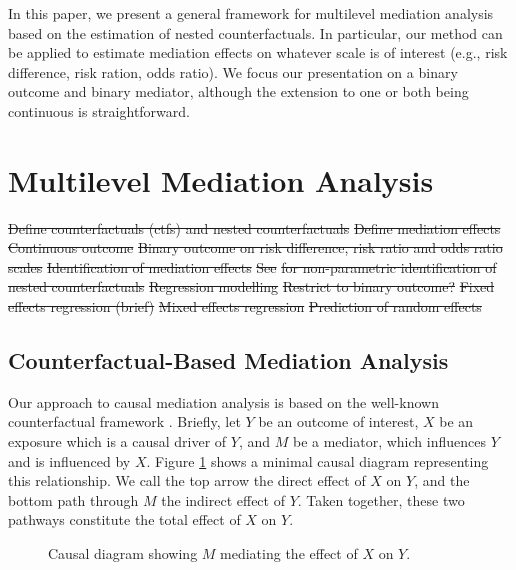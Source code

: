 \documentclass{article}
\begin{document}
In this paper, we present a general framework for multilevel mediation analysis based on the estimation of nested counterfactuals. In particular, our method can be applied to estimate mediation effects on whatever scale is of interest (e.g., risk difference, risk ration, odds ratio). We focus our presentation on a binary outcome and binary mediator, although the extension to one or both being continuous is straightforward.




\section{Multilevel Mediation Analysis}

\begin{outline}
    \1 \st{Define counterfactuals (ctfs) and nested counterfactuals }
    \1 \st{Define mediation effects}
        \2 \st{Continuous outcome}
        \2 \st{Binary outcome on risk difference, risk ratio and odds ratio scales}
    \1 \st{Identification of mediation effects}
        \2 \st{See} \citet{Ima10I} \st{for non-parametric identification of nested counterfactuals}
    \1 \st{Regression modelling}
        \2 \st{Restrict to binary outcome?}
        \2 \st{Fixed effects regression (brief)}
        \2 \st{Mixed effects regression}
        \2 \st{Prediction of random effects}
\end{outline}


\subsection{Counterfactual-Based Mediation Analysis}
\label{sec:MA_defns}

Our approach to causal mediation analysis is based on the well-known counterfactual framework \citep[see, e.g.,][]{Van09,Pea12}. Briefly, let $Y$ be an outcome of interest, $X$ be an exposure which is a causal driver of $Y$, and $M$ be a mediator, which influences $Y$ and is influenced by $X$. Figure \ref{fig:simp_med} shows a minimal causal diagram representing this relationship. We call the top arrow the direct effect of $X$ on $Y$, and the bottom path through $M$ the indirect effect of $Y$. Taken together, these two pathways constitute the total effect of $X$ on $Y$.

\begin{figure}
    \centering
      \caption{Causal diagram showing $M$ mediating the effect of $X$ on $Y$.}    
      \label{fig:simp_med}
\end{figure}
\end{document}

